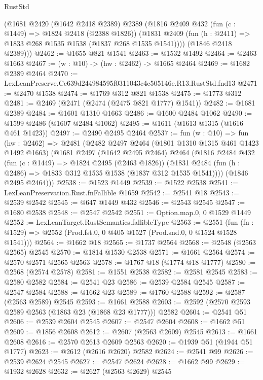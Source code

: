 \begin{lexlean}{RustStd}
\begin{coremodule}
      (@1681
        @2420
        (@1642 @2418 @2389)
        @2389
        (@1816
          @2409
          @432
          (fun (c : @1449) => @1824 @2418 (@2388 @1826))
          (@1831 @2409 (fun (h : @2411) => @1833 @268 @1535 @1538 (@1837 @268 @1535 @1541))))
        (@1846 @2418 @2389)))
@2462 := @1655 @821 @1541
@2463 := @1532 @1492
@2464 := @2463 @1663
@2467 := (w : @10) -> (hw : @2462) -> @1665 @2464
@2469 := @1682 @2389 @2464
@2470 := LexLeanPreserve.Cc639d244984595f0311043c4c505146e.R13.RustStd.fnd13
@2471 := @2470 @1538
@2474 := @1769 @312 @821 @1538
@2475 := @1773 @312
@2481 := @2469 (@2471 (@2474 (@2475 @821 @1777) @1541))
@2482 := @1681 @2389
@2484 := @1601 @1310 @1663
@2486 := @1600 @2484 @1062
@2490 := @1599 @2486 (@1607 @2484 @1062)
@2495 := @1611 (@1613 @1315 (@1616 @461 @1423))
@2497 := @2490 @2495 @2464
@2537 := fun (w : @10) =>
  fun (hw : @2462) =>
  @2481
    (@2482
      @2497
      @2464
      (@1801 @1310 @1315 @461 @1423 @1492 @1663)
      (@1681
        @2497
        (@1642 @2495 @2464)
        @2464
        (@1816
          @2484
          @432
          (fun (c : @1449) => @1824 @2495 (@2463 @1826))
          (@1831 @2484 (fun (h : @2486) => @1833 @312 @1535 @1538 (@1837 @312 @1535 @1541))))
        (@1846 @2495 @2464)))
@2538 := @1523 @1449
@2539 := @1522 @2538
@2541 := LexLeanPreservation.Rust.fnFallible @1659
@2542 := @2541 @18
@2543 := @2539 @2542
@2545 := @647 @1449 @432
@2546 := @2543 @2545
@2547 := @1680 @2538
@2548 := @2547 @2542
@2551 := Option.map.{0, 0} @1529 @1449
@2552 := LexLeanTarget.RustSemantics.fallibleType
@2563 := @2551
    (fun (fn : @1529) => @2552 (Prod.fst.{0, 0} @405 @1527 (Prod.snd.{0, 0} @1524 @1528 @1541)))
@2564 := @1662 @18
@2565 := @1737 @2564
@2568 := @2548 (@2563 @2565) @2545
@2570 := @1814 @1530 @2538
@2571 := @1661 @2564
@2574 := @2570 @2571 @2565 @2563
@2578 := @1767 @18 (@1774 @18 @1777)
@2580 := @2568 (@2574 @2578)
@2581 := @1551 @2538
@2582 := @2581 @2545
@2583 := @2580 @2582
@2584 := @2541 @23
@2586 := @2539 @2584 @2545
@2587 := @2547 @2584
@2588 := @1662 @23
@2589 := @1760 @2588
@2592 := @2587 (@2563 @2589) @2545
@2593 := @1661 @2588
@2603 := @2592 (@2570 @2593 @2589 @2563 (@1863 @23 (@1868 @23 @1777))) @2582
@2604 := @2541 @51
@2606 := @2539 @2604 @2545
@2607 := @2547 @2604
@2608 := @1662 @51
@2609 := @1856 @2608
@2612 := @2607 (@2563 @2609) @2545
@2613 := @1661 @2608
@2616 := @2570 @2613 @2609 @2563
@2620 := @1939 @51 (@1944 @51 @1777)
@2623 := @2612 (@2616 @2620) @2582
@2624 := @2541 @99
@2626 := @2539 @2624 @2545
@2627 := @2547 @2624
@2628 := @1662 @99
@2629 := @1932 @2628
@2632 := @2627 (@2563 @2629) @2545

\end{coremodule}
\end{lexlean}
